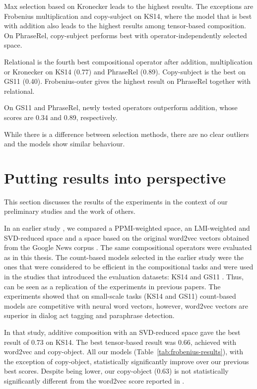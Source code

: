 Max selection based on Kronecker leads to the highest results. The exceptions are Frobenius multiplication and copy-subject on KS14, where the model that is best with addition also leads to the highest results among tensor-based composition. On PhraseRel, copy-subject performs best with operator-independently selected space.

Relational is the fourth best compositional operator after addition, multiplication or Kronecker on KS14 (0.77) and PhraseRel (0.89). Copy-subject is the best on GS11 (0.40). Frobenius-outer gives the highest result on PhraseRel together with relational.

On GS11 and PhraseRel, newly tested operators outperform addition, whose scores are 0.34 and 0.89, respectively.

While there is a difference between selection methods, there are no clear outliers and the models show similar behaviour.

\section{Putting results into perspective}
\label{sec:comp-with-other}

This section discusses the results of the experiments in the context of our preliminary studies and the work of others.

In an earlier study \cite{milajevs-EtAl:2014:EMNLP2014}, we compared a PPMI-weighted space, an LMI-weighted and SVD-reduced space and a space based on the original word2vec vectors obtained from the Google News corpus \cite{mikolov2013distributed}. The same compositional operators were evaluated as in this thesis. The count-based models selected in the earlier study were the ones that were considered to be efficient in the compositional tasks and were used in the studies that introduced the evaluation datasets: KS14 \cite{kartsadrqpl2014} and GS11 \cite{Grefenstette:2011:ESC:2145432.2145580}. Thus,  can be seen as a replication of the experiments in previous papers. The experiments showed that on small-scale tasks (KS14 and GS11) count-based models are competitive with neural word vectors, however, word2vec vectors are superior in dialog act tagging and paraphrase detection.

In that study, additive composition with an SVD-reduced space gave the best result of 0.73 on KS14. The best tensor-based result was 0.66, achieved with word2vec and copy-object. All our models (Table~\ref{tab:frobenius-results}), with the exception of copy-object, statistically significantly improve over our previous best scores. Despite being lower, our copy-object (0.63) is not statistically significantly different from the word2vec score reported in .

